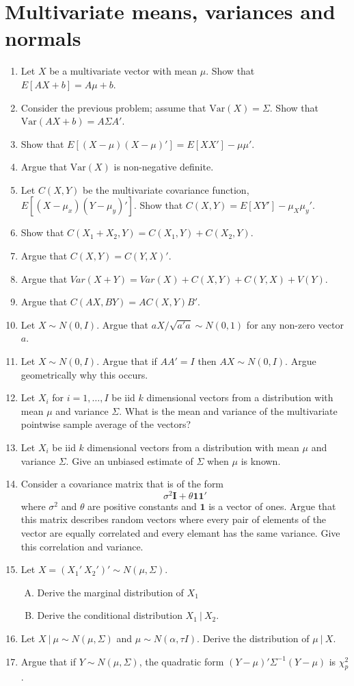 \documentclass[12pt]{article}
\begin{document}
\section{Multivariate means, variances and normals}
\begin{enumerate}[1.]
\item Let $X$ be a multivariate vector with mean $\mu$. Show that $E[AX + b] = A\mu + b$.
\item Consider the previous problem; assume that $\mbox{Var}(X) = \Sigma$. Show that $\mbox{Var}(AX + b) = A\Sigma A'$.
\item Show that $E[(X - \mu)(X - \mu)'] = E[XX'] - \mu\mu'$.
\item Argue that $\mbox{Var}(X)$ is non-negative definite.
\item Let $C(X, Y)$ be the multivariate covariance function, $E[(X - \mu_x) (Y - \mu_y)']$.
  Show that $C(X, Y) = E[XY'] - \mu_X\mu_y'$. 
\item Show that $C(X_1 + X_2, Y) = C(X_1, Y) + C(X_2, Y)$.
\item Argue that $C(X, Y) = C(Y, X)'$. 
\item Argue that $Var(X + Y) = Var(X) + C(X, Y) + C(Y, X) + V(Y)$.
\item Argue that $C(AX, BY) = AC(X, Y)B'$.  
\item Let $X \sim N(0, I)$. Argue that $a X / \sqrt{a'a} \sim N(0, 1)$ for any non-zero vector $a$. 
\item Let $X \sim N(0, I)$. Argue that if $AA' = I$ then $AX \sim N(0, I)$. Argue geometrically why this occurs.
\item Let $X_i$ for $i=1,\ldots, I$ be iid $k$ dimensional vectors
from a distribution with mean $\mu$ and variance $\Sigma$. 
What is the mean and variance of the multivariate pointwise sample
average of the vectors?
\item Let $X_i$ be iid $k$ dimensional vectors
from a distribution with mean $\mu$ and variance $\Sigma$.
Give an unbiased estimate of $\Sigma$ when $\mu$ is known.
\item Consider a covariance matrix that is of the form
$$
\sigma^2 \mathbf{I} + \theta \mathbf{1}\mathbf{1}'
$$	where $\sigma^2$ and $\theta$ are positive constants
and $\mathbf{1}$ is a vector of ones. Argue that this
matrix describes random vectors where every pair of elements of 
the vector are 
equally correlated and every elemant has the same variance. Give
this correlation and variance.
\item Let $X = (X_1' ~ X_2')' \sim N(\mu, \Sigma)$.
  \begin{enumerate}[A.]
  \item Derive the marginal distribution of $X_1$
  \item Derive the conditional distribution $X_1 ~|~ X_2$. 
  \end{enumerate}
\item Let $X ~|~ \mu \sim N(\mu, \Sigma)$ and $\mu \sim N(\alpha, \tau I)$. Derive the distribution of
  $\mu ~|~ X$.
 \item Argue that if $Y \sim N(\mu, \Sigma)$, the quadratic form $(Y - \mu)'\Sigma^{-1}(Y - \mu)$ is $\chi^2_p$. 
\end{enumerate}
\end{document}
